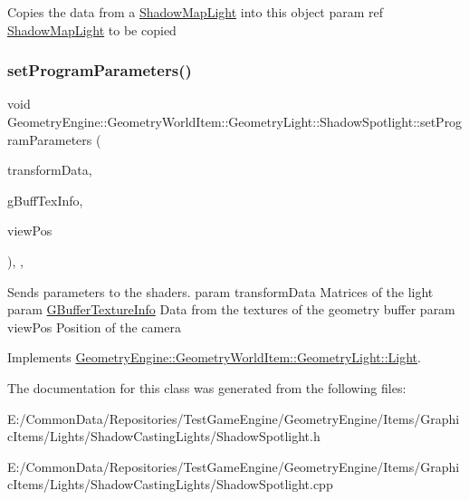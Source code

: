 Copies the data from a \mbox{\hyperlink{class_geometry_engine_1_1_geometry_world_item_1_1_geometry_light_1_1_shadow_map_light}{Shadow\+Map\+Light}} into this object param ref \mbox{\hyperlink{class_geometry_engine_1_1_geometry_world_item_1_1_geometry_light_1_1_shadow_map_light}{Shadow\+Map\+Light}} to be copied \mbox{\label{class_geometry_engine_1_1_geometry_world_item_1_1_geometry_light_1_1_shadow_spotlight_aea5bd6e9315d5df327f59d752f8c6f95}} 
\subsubsection{\texorpdfstring{setProgramParameters()}{setProgramParameters()}}
{\footnotesize\ttfamily void Geometry\+Engine\+::\+Geometry\+World\+Item\+::\+Geometry\+Light\+::\+Shadow\+Spotlight\+::set\+Program\+Parameters (\begin{DoxyParamCaption}\item[{const \mbox{\hyperlink{class_geometry_engine_1_1_lighting_transformation_data}{Lighting\+Transformation\+Data}} \&}]{transform\+Data,  }\item[{const \mbox{\hyperlink{class_geometry_engine_1_1_g_buffer_texture_info}{G\+Buffer\+Texture\+Info}} \&}]{g\+Buff\+Tex\+Info,  }\item[{const Q\+Vector3D \&}]{view\+Pos }\end{DoxyParamCaption})\hspace{0.3cm}{\ttfamily [override]}, {\ttfamily [protected]}, {\ttfamily [virtual]}}

Sends parameters to the shaders. param transform\+Data Matrices of the light param \mbox{\hyperlink{class_geometry_engine_1_1_g_buffer_texture_info}{G\+Buffer\+Texture\+Info}} Data from the textures of the geometry buffer param view\+Pos Position of the camera 

Implements \mbox{\hyperlink{class_geometry_engine_1_1_geometry_world_item_1_1_geometry_light_1_1_light_a366be5945389fe58df4bf5aa8c43138f}{Geometry\+Engine\+::\+Geometry\+World\+Item\+::\+Geometry\+Light\+::\+Light}}.



The documentation for this class was generated from the following files\+:\begin{DoxyCompactItemize}
\item 
E\+:/\+Common\+Data/\+Repositories/\+Test\+Game\+Engine/\+Geometry\+Engine/\+Items/\+Graphic\+Items/\+Lights/\+Shadow\+Casting\+Lights/Shadow\+Spotlight.\+h\item 
E\+:/\+Common\+Data/\+Repositories/\+Test\+Game\+Engine/\+Geometry\+Engine/\+Items/\+Graphic\+Items/\+Lights/\+Shadow\+Casting\+Lights/Shadow\+Spotlight.\+cpp\end{DoxyCompactItemize}
